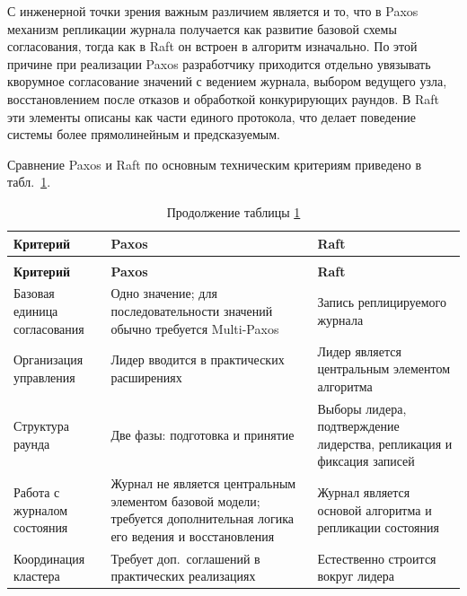 С инженерной точки зрения важным различием является и то, что в Paxos механизм
репликации журнала получается как развитие базовой схемы согласования, тогда
как в Raft он встроен в алгоритм изначально. По этой причине при реализации
Paxos разработчику приходится отдельно увязывать кворумное согласование
значений с ведением журнала, выбором ведущего узла, восстановлением после
отказов и обработкой конкурирующих раундов. В Raft эти элементы описаны как
части единого протокола, что делает поведение системы более прямолинейным и
предсказуемым.

Сравнение Paxos и Raft по основным техническим критериям приведено в
табл.~\ref{tab:paxos-raft-comparison}.

\begin{longtable}{|p{}|p{}|p{}|}
    \caption{Сравнение алгоритмов Paxos и Raft}
    \label{tab:paxos-raft-comparison} \\ \hline
    \textbf{Критерий} & \textbf{Paxos} & \textbf{Raft} \\ \hline
    \endfirsthead

    \caption*{Продолжение таблицы \ref{tab:paxos-raft-comparison}} \\ \hline
    \textbf{Критерий} & \textbf{Paxos} & \textbf{Raft} \\ \hline
    \endhead

    \hline
    \endfoot

    \hline
    \endlastfoot

    Базовая единица согласования &
    Одно значение; для последовательности значений обычно требуется Multi-Paxos &
    Запись реплицируемого журнала \\ \hline

    Организация управления &
    Лидер вводится в практических расширениях &
    Лидер является центральным элементом алгоритма \\ \hline

    Структура раунда &
    Две фазы: подготовка и принятие &
    Выборы лидера, подтверждение лидерства, репликация и фиксация записей \\ \hline

    Работа с журналом состояния &
    Журнал не является центральным элементом базовой модели; требуется дополнительная логика его ведения и восстановления &
    Журнал является основой алгоритма и репликации состояния \\ \hline

    Координация кластера &
    Требует доп.\ соглашений в практических реализациях &
    Естественно строится вокруг лидера \\ \hline


\end{longtable}
